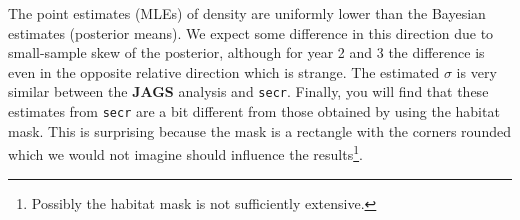 The point estimates (MLEs) of density are uniformly lower than the Bayesian estimates
(posterior means). We expect some difference in this direction due to
small-sample skew of the posterior, although for year 2 and 3 the
difference is even in the opposite relative direction which is
strange. %
The estimated $\sigma$ is very similar between the {\bf JAGS}
analysis and \mbox{\tt secr}.
Finally, you will find that these estimates from \mbox{\tt secr}
 are a bit different from those obtained by
using the habitat mask. This is surprising because the mask
is a rectangle with the corners
rounded which we would not imagine should influence the results\footnote{
Possibly the habitat mask is not sufficiently extensive.}.

